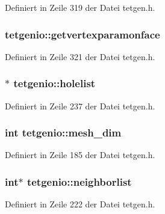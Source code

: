 Definiert in Zeile 319 der Datei tetgen.\-h.

\hypertarget{classtetgenio_abe5875cae7c00d505062e62e52e9a8dd}{
\subsubsection[{getvertexparamonface}]{ tetgenio\-::getvertexparamonface}}\label{classtetgenio_abe5875cae7c00d505062e62e52e9a8dd}


Definiert in Zeile 321 der Datei tetgen.\-h.

\hypertarget{classtetgenio_a395bd7fc3f66dd013efd5176a0d54265}{
\subsubsection[{holelist}]{$\ast$ tetgenio\-::holelist}}\label{classtetgenio_a395bd7fc3f66dd013efd5176a0d54265}


Definiert in Zeile 237 der Datei tetgen.\-h.

\hypertarget{classtetgenio_a79a469ad1e88f5830d2fcefe9a8ca53f}{
\subsubsection[{mesh\-\_\-dim}]{\setlength{\rightskip}{0pt plus 5cm}int tetgenio\-::mesh\-\_\-dim}}\label{classtetgenio_a79a469ad1e88f5830d2fcefe9a8ca53f}


Definiert in Zeile 185 der Datei tetgen.\-h.

\hypertarget{classtetgenio_ab79a85fdffb1ab3f93ff3645fb604d40}{
\subsubsection[{neighborlist}]{\setlength{\rightskip}{0pt plus 5cm}int$\ast$ tetgenio\-::neighborlist}}\label{classtetgenio_ab79a85fdffb1ab3f93ff3645fb604d40}


Definiert in Zeile 222 der Datei tetgen.\-h.

